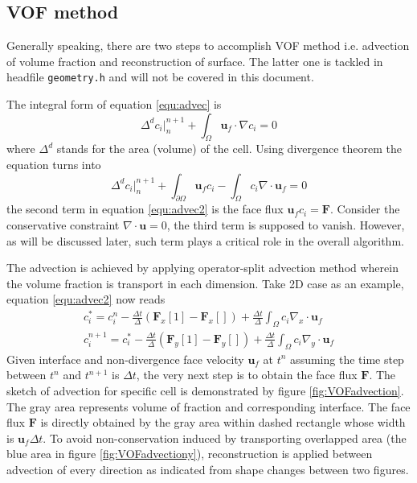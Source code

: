 \subsection{VOF method}
Generally speaking, there are two steps to accomplish VOF method i.e. advection of volume fraction and reconstruction of surface. The latter one is tackled in headfile \texttt{geometry.h} and will not be covered in this document.\par
 The integral form of equation \ref{equ:advec} is
\begin{equation}
    \Delta^{d} c_i|^{n+1}_{n} + \int_{\Omega}\mathbf{u}_f\cdot\nabla c_i= 0
\end{equation}
where $\Delta^d$ stands for the area (volume) of the cell.
Using divergence theorem the equation turns into
\begin{equation}\label{equ:advec2}
    \Delta^{d} c_i|^{n+1}_{n} + \int_{\partial\Omega}\mathbf{u}_f c_i - \int_{\Omega}c_i\nabla\cdot \mathbf{u}_f= 0
\end{equation}
the second term in equation \ref{equ:advec2} is the face flux $\mathbf{u}_fc_i=\mathbf{F}$. Consider the conservative constraint $\nabla\cdot\mathbf{u}=0$, the third term is supposed to vanish. However, as will be discussed later, such term plays a critical role in the overall algorithm.\par
The advection is achieved by applying operator-split advection method\cite{2011_Gretar} wherein the volume fraction is transport in each dimension. Take 2D case as an example, equation \ref{equ:advec2} now reads
\begin{align}
    c_i^\ast = c_i^{n} - \frac{\Delta t}{\Delta}(\mathbf{F}_x[1]-\mathbf{F}_x[]) + \frac{\Delta t}{\Delta}\int_{\Omega}c_i\nabla_x\cdot\mathbf{u}_f\label{equ:advec3x}\\
    c_i^{n+1} = c_i^\ast - \frac{\Delta t}{\Delta}(\mathbf{F}_y[1]-\mathbf{F}_y[]) + \frac{\Delta t}{\Delta} \int_{\Omega}c_i\nabla_y\cdot\mathbf{u}_f
\end{align}
Given interface and non-divergence face velocity $\mathbf{u}_f$ at $t^n$ assuming the time step between $t^{n}$ and $t^{n+1}$ is $\Delta t$, the very next step is to obtain the face flux $\mathbf{F}$. The sketch of advection for specific cell is demonstrated by figure \ref{fig:VOFadvection}. The gray area represents volume of fraction and corresponding interface.
The face flux $\mathbf{F}$ is directly obtained by the gray area within dashed rectangle whose width is $\mathbf{u}_f\Delta t$. To avoid non-conservation induced by transporting overlapped area (the blue area in figure \ref{fig:VOFadvectiony}), reconstruction is applied between advection of every direction as indicated from shape changes between two figures.\par

